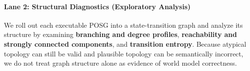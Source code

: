 \documentclass{article}
\begin{document}
\paragraph{Lane 2: Structural Diagnostics (Exploratory Analysis)}


We roll out each executable POSG into a state-transition graph and analyze its structure by examining \textbf{branching and degree profiles}, \textbf{reachability and strongly connected components}, and \textbf{transition entropy}. Because atypical topology can still be valid and plausible topology can be semantically incorrect, we do not treat graph structure alone as evidence of world model correctness.
\end{document}
